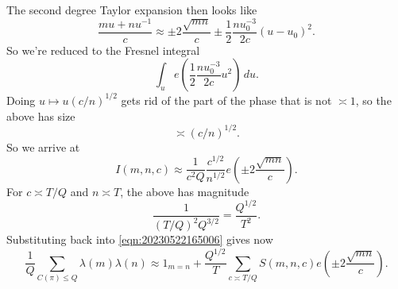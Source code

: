 \documentclass[reqno]{amsart} 
\begin{document}
The second degree Taylor expansion then looks like
\begin{equation*}
  \frac{m u + n u^{-1} }{c}
  \approx
  \pm 2 \frac{\sqrt{m n }}{c}
  \pm \frac{1}{2} \frac{n u_0^{-3}}{2 c} (u - u_0)^2.
\end{equation*}
So we're reduced to the Fresnel integral
\begin{equation*}
\int_{u} e \left( \frac{1}{2} \frac{n u_0^{-3}}{2 c} u^2 \right) \, d u.
\end{equation*}
Doing $u \mapsto u (c/n)^{1/2}$ gets rid of the part of the phase that is not $\asymp 1$, so the above has size
\begin{equation*}
\asymp (c / n)^{1/2}.
\end{equation*}
So we arrive at
\begin{equation*}
I(m,n,c) \approx \frac{1}{c^2 Q} \frac{c^{1/2} }{ n^{1/2} } e \left( \pm 2 \frac{\sqrt{m n }}{c} \right).
\end{equation*}
For $c \asymp T/Q$ and $n \asymp T$, the above has magnitude
\begin{equation*}
\frac{1}{(T/Q)^2 Q^{3/2}} = \frac{ Q^{1/2}}{T^2}.
\end{equation*}
Substituting back into \eqref{eqn:20230522165006} gives now
\begin{equation*}
 \frac{1}{Q}
  \sum _{C(\pi) \leq Q}
  \lambda(m) \lambda(n)
  \approx
  1 _{m = n}
  +
  \frac{ Q^{1/2}}{T }
  \sum_{c \asymp T/Q}
  S(m,n,c) e \left( \pm 2 \frac{\sqrt{m n} }{c} \right).
\end{equation*}


{} 
\end{document}
